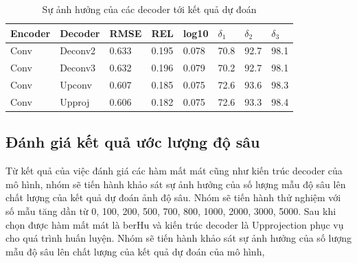 \begin{enumerate}
\begin{table}[H]
\centering
\begin{tabular}{ |p{1.5cm}|p{1.5cm}|p{1.5cm}|p{1cm}|p{1cm}|p{1cm}|p{1cm}|p{1cm}|}
\hline
Encoder &  Decoder & RMSE &  REL & log10  &$\delta_1$ & $\delta_2$ & $\delta_3$ \\
\hline
Conv & Deconv2 & 0.633 & 0.195 & 0.078 & 70.8 & 92.7 & 98.1 \\
\hline
 Conv &  Deconv3  & 0.632 & 0.196 & 0.079 &  70.2 & 92.7 & 98.1\\
\hline
 Conv & Upconv & 0.607 & 0.185 & 0.075 & 72.6 & 93.6 & 98.3 \\
\hline
Conv & Upproj & 0.606 & 0.182 & 0.075 & 72.6 & 93.3 & 98.4 \\
\hline
\end{tabular}
\caption{Sự ảnh hưởng của các decoder tới kết quả dự đoán}
\label{tab:compare_decoder}
\end{table}
\end{enumerate} 

\subsection{Đánh giá kết quả ước lượng độ sâu}
Từ kết quả của việc đánh giá các hàm mất mát cũng như kiến trúc decoder của mô hình, nhóm sẽ tiến hành khảo sát sự ảnh hưởng của số lượng mẫu độ sâu lên chất lượng của kết quả dự đoán ảnh độ sâu. Nhóm sẽ tiến hành thử nghiệm với số mẫu tăng dần từ 0, 100, 200, 500, 700, 800, 1000, 2000, 3000, 5000. 
Sau khi chọn được hàm mất mát là berHu và kiến trúc decoder là Upprojection phục vụ cho quá trình huấn luyện. Nhóm sẽ tiến hành khảo sát sự ảnh hưởng của số lượng mẫu độ sâu lên chất lượng của kết quả dự đoán của mô hình, 


